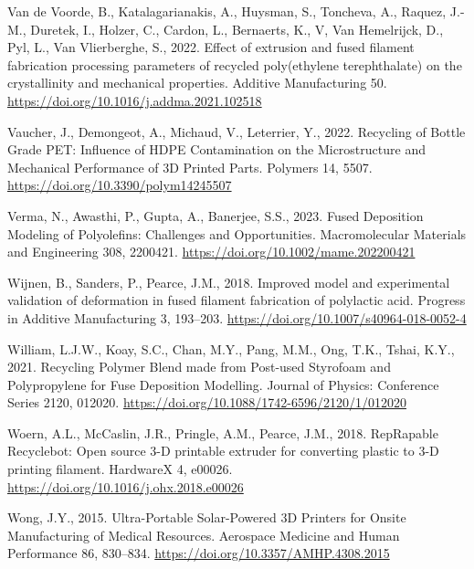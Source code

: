 \documentclass[
  12pt,
  number,
  review]{elsarticle}
\newlength{\cslhangindent}
\newlength{\cslentryspacingunit} %
\newenvironment{CSLReferences}[2] %
 {%
  \setlength{\parindent}{0pt}
  \ifodd #1
  \let\oldpar\par
  \def\par{\hangindent=\cslhangindent\oldpar}
  \fi
  \setlength{\parskip}{#2\cslentryspacingunit}
 }%
 {}
\begin{document}
\begin{CSLReferences}{1}{0}
\leavevmode{}%
Van de Voorde, B., Katalagarianakis, A., Huysman, S., Toncheva, A.,
Raquez, J.-M., Duretek, I., Holzer, C., Cardon, L., Bernaerts, K., V,
Van Hemelrijck, D., Pyl, L., Van Vlierberghe, S., 2022. Effect of
extrusion and fused filament fabrication processing parameters of
recycled poly(ethylene terephthalate) on the crystallinity and
mechanical properties. Additive Manufacturing 50.
\url{https://doi.org/10.1016/j.addma.2021.102518}

\leavevmode{}%
Vaucher, J., Demongeot, A., Michaud, V., Leterrier, Y., 2022. Recycling
of {Bottle Grade PET}: {Influence} of {HDPE Contamination} on the
{Microstructure} and {Mechanical Performance} of {3D Printed Parts}.
Polymers 14, 5507. \url{https://doi.org/10.3390/polym14245507}

\leavevmode{}%
Verma, N., Awasthi, P., Gupta, A., Banerjee, S.S., 2023. Fused
{Deposition Modeling} of {Polyolefins}: {Challenges} and
{Opportunities}. Macromolecular Materials and Engineering 308, 2200421.
\url{https://doi.org/10.1002/mame.202200421}

\leavevmode{}%
Wijnen, B., Sanders, P., Pearce, J.M., 2018. Improved model and
experimental validation of deformation in fused filament fabrication of
polylactic acid. Progress in Additive Manufacturing 3, 193--203.
\url{https://doi.org/10.1007/s40964-018-0052-4}

\leavevmode{}%
William, L.J.W., Koay, S.C., Chan, M.Y., Pang, M.M., Ong, T.K., Tshai,
K.Y., 2021. Recycling {Polymer Blend} made from {Post-used Styrofoam}
and {Polypropylene} for {Fuse Deposition Modelling}. Journal of Physics:
Conference Series 2120, 012020.
\url{https://doi.org/10.1088/1742-6596/2120/1/012020}

\leavevmode{}%
Woern, A.L., McCaslin, J.R., Pringle, A.M., Pearce, J.M., 2018.
{RepRapable Recyclebot}: {Open} source 3-{D} printable extruder for
converting plastic to 3-{D} printing filament. HardwareX 4, e00026.
\url{https://doi.org/10.1016/j.ohx.2018.e00026}

\leavevmode{}%
Wong, J.Y., 2015. Ultra-{Portable Solar-Powered 3D Printers} for {Onsite
Manufacturing} of {Medical Resources}. Aerospace Medicine and Human
Performance 86, 830--834. \url{https://doi.org/10.3357/AMHP.4308.2015}


\end{CSLReferences}
\end{document}

